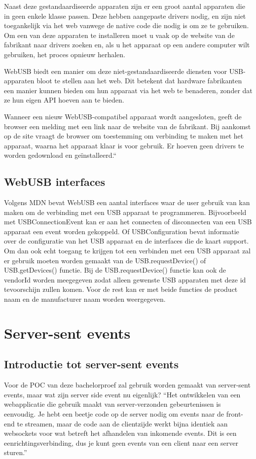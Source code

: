 Naast deze gestandaardiseerde apparaten zijn er een groot aantal apparaten die in geen enkele klasse passen. Deze hebben aangepaste drivers nodig, en zijn niet toegankelijk via het web vanwege de native code die nodig is om ze te gebruiken. Om een van deze apparaten te installeren moet u vaak op de website van de fabrikant naar drivers zoeken en, als u het apparaat op een andere computer wilt gebruiken, het proces opnieuw herhalen.

WebUSB biedt een manier om deze niet-gestandaardiseerde diensten voor USB-apparaten bloot te stellen aan het web. Dit betekent dat hardware fabrikanten een manier kunnen bieden om hun apparaat via het web te benaderen, zonder dat ze hun eigen API hoeven aan te bieden.

Wanneer een nieuw WebUSB-compatibel apparaat wordt aangesloten, geeft de browser een melding met een link naar de website van de fabrikant. Bij aankomst op de site vraagt de browser om toestemming om verbinding te maken met het apparaat, waarna het apparaat klaar is voor gebruik. Er hoeven geen drivers te worden gedownload en geïnstalleerd.``\autocite{DevMozWebUSB}

\subsection{WebUSB interfaces}
Volgens MDN \textcite{DevMozWebUSB} bevat WebUSB een aantal interfaces waar de user gebruik van kan maken om de verbinding met een USB apparaat te programmeren. Bijvoorbeeld met USBConnectionEvent kan er aan het connecten of disconnecten van een USB apparaat een event worden gekoppeld. Of USBConfiguration bevat informatie over de configuratie van het USB apparaat en de interfaces die de kaart support.
Om dan ook echt toegang te krijgen tot een verbinden met een USB apparaat zal er gebruik moeten worden gemaakt van de USB.requestDevice() of USB.getDevices()  functie. Bij de USB.requestDevice() functie kan ook de vendorId worden meegegeven zodat alleen gewenste USB apparaten met deze id tevoorschijn zullen komen. Voor de rest kan er met beide functies de product naam en de manufacturer naam worden weergegeven.




\section{Server-sent events}
\subsection{Introductie tot server-sent events}
Voor de POC van deze bachelorproef zal gebruik worden gemaakt van server-sent events, maar wat zijn server side event nu eigenlijk?
``Het ontwikkelen van een webapplicatie die gebruik maakt van server-verzonden gebeurtenissen is eenvoudig. Je hebt een beetje code op de server nodig om events naar de front-end te streamen, maar de code aan de clientzijde werkt bijna identiek aan websockets voor wat betreft het afhandelen van inkomende events. Dit is een eenrichtingsverbinding, dus je kunt geen events van een client naar een server sturen.''\autocite{DevMozSSE}

